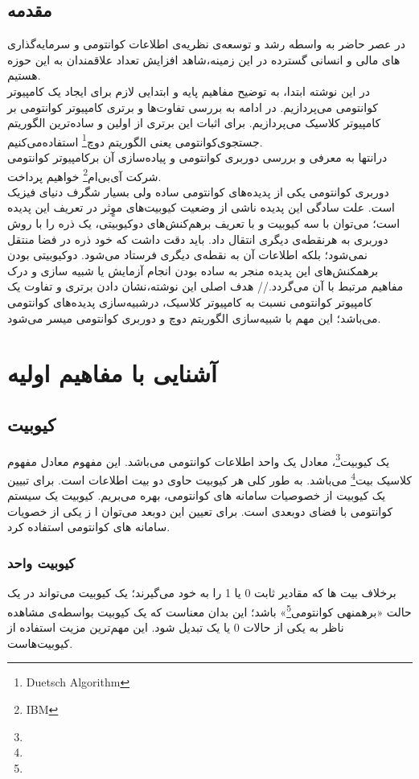 \documentclass{book}
\begin{document}
\section*{مقدمه}	
در عصر حاضر به‌ واسطه رشد و توسعه‌ی نظریه‌ی اطلاعات کوانتومی و سرمایه‌گذاری های مالی و انسانی گسترده در این زمینه،‌شاهد افزایش تعداد علاقمندان به این حوزه هستیم.\\
در این نوشته ابتدا، به توضیح مفاهیم پایه و ابتدایی لازم برای ایجاد یک کامپیوتر کوانتومی می‌پردازیم. در ادامه به بررسی تفاوت‌ها و برتری کامپیوتر کوانتومی بر کامپیوتر کلاسیک می‌پردازیم. برای اثبات این برتری از اولین و ساده‌ترین الگوریتم جستجوی‌کوانتومی یعنی الگوریتم دوچ\footnote{Duetsch Algorithm} استفاده‌می‌کنیم.\\

 درانتها به معرفی و بررسی دوربری کوانتومی و پیاده‌سازی آن برکامپیوتر کوانتومی شرکت آی‌بی‌ام\footnote{IBM} خواهیم پرداخت.\\
دوربری کوانتومی یکی از پدیده‌های کوانتومی ساده ولی بسیار شگرف دنیای فیزیک است. علت سادگی این پدیده ناشی از وضعیت کیوبیت‌های موٍثر در تعریف این پدیده است؛ می‌توان با سه کیوبیت و با تعریف برهم‌کنش‌های دوکیوبیتی، یک ذره را با روش دوربری به هرنقطه‌ی دیگری انتقال داد. باید دقت داشت که خود ذره در فضا منتقل نمی‌شود؛ بلکه اطلاعات آن به نقطه‌ی دیگری فرستاد می‌شود.
دوکیوبیتی بودن برهمکنش‌های این پدیده منجر به ساده بودن انجام آزمایش یا شبیه سازی و درک مفاهیم مرتبط با آن می‌گردد.//
هدف اصلی این نوشته،‌نشان دادن برتری و تفاوت یک کامپیوتر کوانتومی نسبت به کامپیوتر کلاسیک، درشبیه‌سازی پدیده‌های کوانتومی می‌باشد؛ این مهم با شبیه‌سازی الگوریتم دوچ و دوربری کوانتومی میسر می‌شود.

\let\cleardoublepage\clearpage
\tableofcontents
\chapter{آشنایی با مفاهیم اولیه}
\section{کیوبیت}

یک کیوبیت\footnote{}، معادل یک واحد اطلاعات کوانتومی می‌باشد. این مفهوم معادل مفهوم کلاسیک بیت\footnote{} می‌باشد. به طور کلی هر کیوبیت حاوی دو بیت اطلاعات است. برای تبیین یک کیوبیت از خصوصیات سامانه های کوانتومی، بهره‌ می‌بریم. کیوبیت یک سیستم کوانتومی با فضای دوبعدی است. برای تعیین این دوبعد می‌توان ا ز یکی از خصویات سامانه های کوانتومی استفاده کرد. 
\subsection{کیوبیت‌ واحد}
برخلاف بیت ها که مقادیر ثابت 0 یا 1 را به خود می‌گیرند؛ یک کیوبیت می‌تواند در یک حالت «برهمنهی کوانتومی\footnote{}» باشد؛ این بدان معناست که یک کیوبیت بواسطه‌ی مشاهده ناظر به یکی از حالات 0 یا یک تبدیل شود. این مهم‌ترین مزیت استفاده از کیوبیت‌هاست. 
\end{document}
